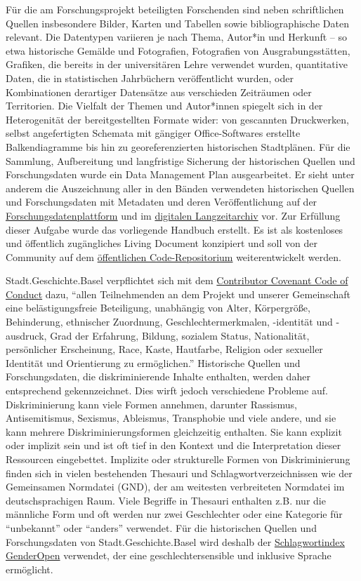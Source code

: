 \documentclass[
  letterpaper,
  DIV=11,
  numbers=noendperiod]{scrartcl}
\begin{document}
Für die am Forschungsprojekt beteiligten Forschenden sind neben
schriftlichen Quellen insbesondere Bilder, Karten und Tabellen sowie
bibliographische Daten relevant. Die Datentypen variieren je nach Thema,
Autor*in und Herkunft -- so etwa historische Gemälde und Fotografien,
Fotografien von Ausgrabungsstätten, Grafiken, die bereits in der
universitären Lehre verwendet wurden, quantitative Daten, die in
statistischen Jahrbüchern veröffentlicht wurden, oder Kombinationen
derartiger Datensätze aus verschieden Zeiträumen oder Territorien. Die
Vielfalt der Themen und Autor*innen spiegelt sich in der Heterogenität
der bereitgestellten Formate wider: von gescannten Druckwerken, selbst
angefertigten Schemata mit gängiger Office-Softwares erstellte
Balkendiagramme bis hin zu georeferenzierten historischen Stadtplänen.
Für die Sammlung, Aufbereitung und langfristige Sicherung der
historischen Quellen und Forschungsdaten wurde ein Data Management Plan
ausgearbeitet. Er sieht unter anderem die Auszeichnung aller in den
Bänden verwendeten historischen Quellen und Forschungsdaten mit
Metadaten und deren Veröffentlichung auf der
\href{https://forschung.stadtgeschichtebasel.ch/}{Forschungsdatenplattform}
und im
\href{https://zenodo.org/communities/stadt-geschichte-basel/}{digitalen
Langzeitarchiv} vor. Zur Erfüllung dieser Aufgabe wurde das vorliegende
Handbuch erstellt. Es ist als kostenloses und öffentlich zugängliches
Living Document konzipiert und soll von der Community auf dem
\href{https://github.com/maehr/diskriminierungsfreie-metadaten}{öffentlichen
Code-Repositorium} weiterentwickelt werden.

Stadt.Geschichte.Basel verpflichtet sich mit dem
\href{https://www.contributor-covenant.org/version/2/1/code_of_conduct/}{Contributor
Covenant Code of Conduct} dazu, ``allen Teilnehmenden an dem Projekt und
unserer Gemeinschaft eine belästigungsfreie Beteiligung, unabhängig von
Alter, Körpergröße, Behinderung, ethnischer Zuordnung,
Geschlechtermerkmalen, -identität und -ausdruck, Grad der Erfahrung,
Bildung, sozialem Status, Nationalität, persönlicher Erscheinung, Race,
Kaste, Hautfarbe, Religion oder sexueller Identität und Orientierung zu
ermöglichen.'' Historische Quellen und Forschungsdaten, die
diskriminierende Inhalte enthalten, werden daher entsprechend
gekennzeichnet. Dies wirft jedoch verschiedene Probleme auf.
Diskriminierung kann viele Formen annehmen, darunter Rassismus,
Antisemitismus, Sexismus, Ableismus, Transphobie und viele andere, und
sie kann mehrere Diskriminierungsformen gleichzeitig enthalten. Sie kann
explizit oder implizit sein und ist oft tief in den Kontext und die
Interpretation dieser Ressourcen eingebettet. Implizite oder
strukturelle Formen von Diskriminierung finden sich in vielen
bestehenden Thesauri und Schlagwortverzeichnissen wie der Gemeinsamen
Normdatei (GND), der am weitesten verbreiteten Normdatei im
deutschsprachigen Raum. Viele Begriffe in Thesauri enthalten z.B. nur
die männliche Form und oft werden nur zwei Geschlechter oder eine
Kategorie für ``unbekannt'' oder ``anders'' verwendet. Für die
historischen Quellen und Forschungsdaten von Stadt.Geschichte.Basel wird
deshalb der
\href{https://opengenderplatform.de/schlagwortindex}{Schlagwortindex
GenderOpen} verwendet, der eine geschlechtersensible und inklusive
Sprache ermöglicht.
\end{document}

